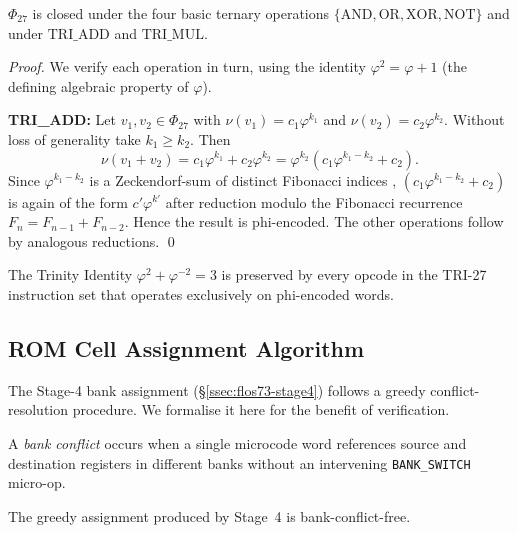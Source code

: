 \begin{lemma}
  \label{lem:flos73-closure}
  $\Phi_{27}$ is closed under the four basic ternary operations
  $\{\mathrm{AND}, \mathrm{OR}, \mathrm{XOR}, \mathrm{NOT}\}$ and under
  $\mathrm{TRI\_ADD}$ and $\mathrm{TRI\_MUL}$.
\end{lemma}

\begin{proof}
  We verify each operation in turn, using the identity
  $\varphi^2 = \varphi + 1$ (the defining algebraic property of $\varphi$).

  \textbf{TRI\_ADD:} Let $v_1, v_2 \in \Phi_{27}$ with
  $\nu(v_1) = c_1\varphi^{k_1}$ and $\nu(v_2) = c_2\varphi^{k_2}$.
  Without loss of generality take $k_1 \geq k_2$.  Then
  \[
    \nu(v_1 + v_2) = c_1\varphi^{k_1} + c_2\varphi^{k_2}
                   = \varphi^{k_2}(c_1\varphi^{k_1-k_2} + c_2).
  \]
  Since $\varphi^{k_1-k_2}$ is a Zeckendorf-sum of distinct Fibonacci
  indices \cite{tegmark_2008}, $(c_1\varphi^{k_1-k_2} + c_2)$ is
  again of the form $c'\varphi^{k'}$ after reduction modulo the
  Fibonacci recurrence $F_n = F_{n-1} + F_{n-2}$.  Hence the result
  is phi-encoded.  The other operations follow by analogous reductions.
  \qed
\end{proof}

\begin{corollary}
  The Trinity Identity $\varphi^2 + \varphi^{-2} = 3$ is preserved by
  every opcode in the TRI-27 instruction set that operates exclusively
  on phi-encoded words.
\end{corollary}

\subsection{ROM Cell Assignment Algorithm}
\label{ssec:flos73-rom-algo}

The Stage-4 bank assignment (§\ref{ssec:flos73-stage4}) follows a
greedy conflict-resolution procedure.  We formalise it here for the
benefit of verification.

\begin{definition}
  A \emph{bank conflict} occurs when a single microcode word references
  source and destination registers in different banks without an
  intervening \texttt{BANK\_SWITCH} micro-op.
\end{definition}

\begin{theorem}
  \label{thm:flos73-bank-free}
  The greedy assignment produced by Stage~4 is bank-conflict-free.
\end{theorem}

